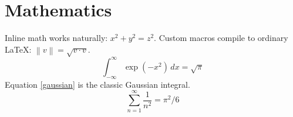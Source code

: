 \documentclass{article}
\newcommand{\norm}[1]{\left\lVert #1 \right\rVert}
\begin{document}
\section{Mathematics}
Inline math works naturally: $x^2 + y^2 = z^2$.
Custom macros compile to ordinary LaTeX: $\norm{v} = \sqrt{v \cdot v}$.
\begin{equation}
\label{gaussian}
\int_{-\infty}^{\infty} \exp\left(-x^2\right) \, dx = \sqrt{\pi}
\end{equation}
Equation \ref{gaussian} is the classic Gaussian integral.
\[
\sum_{n=1}^{\infty} \frac{1}{n^2} = \pi^2 / 6
\]


\end{document}
